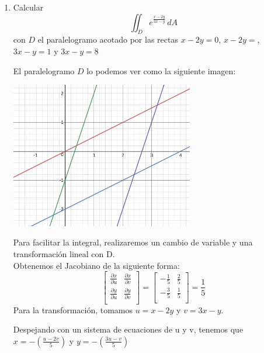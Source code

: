 \documentclass{article}
\begin{document}
\begin{enumerate}
        \item {
            Calcular
            \[
                \iint_{D}{e^{\frac{x-2y}{3x-y}}\,dA}
            \]
            con $D$ el paralelogramo acotado por las rectas $x-2y=0$, $x-2y=$,
            $3x-y=1$ y $3x-y=8$

            \color{azul}
             El paralelogramo $D$ lo podemos ver como la siguiente imagen:\\
             \begin{center}
                 \includegraphics[width=8cm]{img/ejercicio2.png}
         	\end{center}

             Para facilitar la integral, realizaremos un cambio de variable y una
             transformación lineal con D.\\
             Obtenemos el Jacobiano de la siguiente forma:
             \[
                 \begin{bmatrix}
                     \frac{\partial x}{\partial u}&
                     \frac{\partial x}{\partial v}\\
                     \frac{\partial y}{\partial u}&
                     \frac{\partial y}{\partial v}\\
                 \end{bmatrix}
                 =
                 \begin{bmatrix}
                     -\frac{1}{5}
                     &\frac{2}{5}\\
                     -\frac{3}{5}
                     &\frac{1}{5}\\
                 \end{bmatrix}
                 =\frac{1}{5}
             \]
             Para la transformación, tomamos $u = x-2y$ y $v= 3x-y$.
            
             Despejando con un sistema de ecuaciones de u y v, tenemos que
             $x = -(\frac{u-2v}{5})$ y  $y = -(\frac{3u-v}{5})$

}
\end{enumerate}
\end{document}
